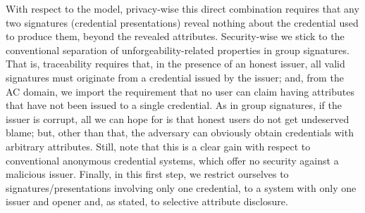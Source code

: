 With respect to the model, privacy-wise this direct combination requires that
any two signatures (credential presentations) reveal nothing about the
credential used to produce them, beyond the revealed attributes.
Security-wise we stick to the conventional separation of
unforgeability-related properties in group signatures. That is, traceability
requires that, in the presence of an honest issuer, all valid signatures must
originate from a credential issued by the issuer; and, from the AC domain, we
import the requirement that no user can claim having attributes that have not
been issued to a single credential. As in group signatures, if the issuer is
corrupt, all we can hope for is that honest users do not get undeserved blame;
but, other than that, the adversary can obviously obtain credentials with
arbitrary attributes. Still, note that this is a clear gain with respect to
conventional anonymous credential systems, which offer no security against a
malicious issuer.
%
Finally, in this first step, we restrict ourselves to signatures/presentations
involving only one credential, to a system with only one issuer and opener  and,
as stated, to selective attribute disclosure.






